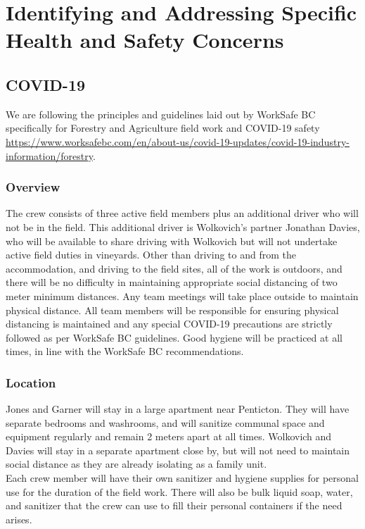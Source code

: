 \documentclass[11pt,letter]{article}
\begin{document}
\section{Identifying and Addressing Specific Health and Safety Concerns}

\subsection{COVID-19}

We are following the principles and guidelines laid out by WorkSafe BC specifically for Forestry and Agriculture field work and COVID-19 safety \url{https://www.worksafebc.com/en/about-us/covid-19-updates/covid-19-industry-information/forestry}. 

\subsubsection{Overview}
The crew consists of three active field members plus an additional driver who will not be in the field. This additional driver is Wolkovich's partner Jonathan Davies, who will be available to share driving with Wolkovich but will not undertake active field duties in vineyards. Other than driving to and from the accommodation, and driving to the field sites, all of the work is outdoors, and there will be no difficulty in maintaining appropriate social distancing of two meter minimum distances. Any team meetings will take place outside to maintain physical distance. All team members will be responsible for ensuring physical distancing is maintained and any special COVID-19 precautions are strictly followed as per WorkSafe BC guidelines. Good hygiene will be practiced at all times, in line with the  WorkSafe BC recommendations. 

\subsubsection{Location}
Jones and Garner will stay in a large apartment near Penticton. They will have separate bedrooms and washrooms, and will sanitize communal space and equipment regularly and remain 2 meters apart at all times. Wolkovich and Davies will stay in a separate apartment close by, but will not need to maintain social distance as they are already isolating as a family unit. \\

Each crew member will have their own sanitizer and hygiene supplies for personal use for the duration of the field work. There will also be bulk liquid soap, water, and sanitizer that the crew can use to fill their personal containers if the need arises.
\end{document}
